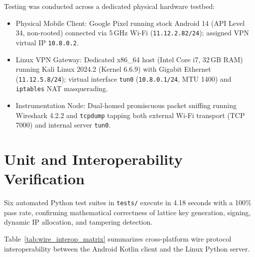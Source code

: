 Testing was conducted across a dedicated physical hardware testbed:
\begin{itemize}
    \item Physical Mobile Client: Google Pixel running stock Android 14 (API Level 34, non-rooted) connected via 5\,GHz Wi-Fi (\texttt{11.12.2.82/24}); assigned VPN virtual IP \texttt{10.8.0.2}.
    \item Linux VPN Gateway: Dedicated x86\_64 host (Intel Core i7, 32\,GB RAM) running Kali Linux 2024.2 (Kernel 6.6.9) with Gigabit Ethernet (\texttt{11.12.5.8/24}); virtual interface \texttt{tun0} (\texttt{10.8.0.1/24}, MTU 1400) and \texttt{iptables} NAT masquerading.
    \item Instrumentation Node: Dual-homed promiscuous packet sniffing running Wireshark 4.2.2 and \texttt{tcpdump} tapping both external Wi-Fi transport (TCP 7000) and internal server \texttt{tun0}.
\end{itemize}

\section{Unit and Interoperability Verification}
\label{sec:unit_interoperability_testing}

Six automated Python test suites in \texttt{tests/} execute in 4.18 seconds with a 100\% pass rate, confirming mathematical correctness of lattice key generation, signing, dynamic IP allocation, and tampering detection.

Table~\ref{tab:wire_interop_matrix} summarizes cross-platform wire protocol interoperability between the Android Kotlin client and the Linux Python server.

